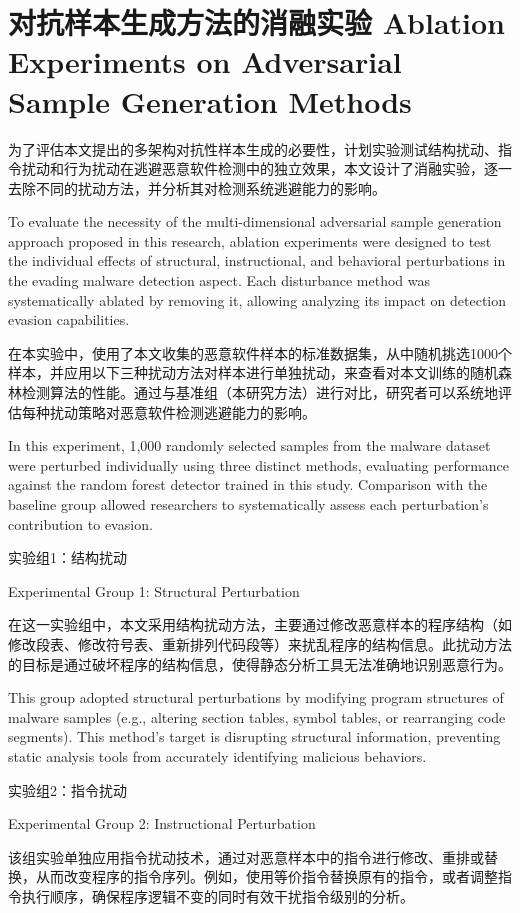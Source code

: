 \section{对抗样本生成方法的消融实验 Ablation Experiments on Adversarial Sample Generation Methods}

为了评估本文提出的多架构对抗性样本生成的必要性，计划实验测试结构扰动、指令扰动和行为扰动在逃避恶意软件检测中的独立效果，本文设计了消融实验，逐一去除不同的扰动方法，并分析其对检测系统逃避能力的影响。

To evaluate the necessity of the multi-dimensional adversarial sample generation approach proposed in this research, ablation experiments were designed to test the individual effects of structural, instructional, and behavioral perturbations in the evading malware detection aspect. Each disturbance method was systematically ablated by removing it, allowing analyzing its impact on detection evasion capabilities.

在本实验中，使用了本文收集的恶意软件样本的标准数据集，从中随机挑选1000个样本，并应用以下三种扰动方法对样本进行单独扰动，来查看对本文训练的随机森林检测算法的性能。通过与基准组（本研究方法）进行对比，研究者可以系统地评估每种扰动策略对恶意软件检测逃避能力的影响。

In this experiment, 1,000 randomly selected samples from the malware dataset were perturbed individually using three distinct methods, evaluating performance against the random forest detector trained in this study. Comparison with the baseline group allowed researchers to systematically assess each perturbation's contribution to evasion.

实验组1：结构扰动

Experimental Group 1: Structural Perturbation

在这一实验组中，本文采用结构扰动方法，主要通过修改恶意样本的程序结构（如修改段表、修改符号表、重新排列代码段等）来扰乱程序的结构信息。此扰动方法的目标是通过破坏程序的结构信息，使得静态分析工具无法准确地识别恶意行为。

This group adopted structural perturbations by modifying program structures of malware samples (e.g., altering section tables, symbol tables, or rearranging code segments). This method's target is disrupting structural information, preventing static analysis tools from accurately identifying malicious behaviors.

实验组2：指令扰动

Experimental Group 2: Instructional Perturbation

该组实验单独应用指令扰动技术，通过对恶意样本中的指令进行修改、重排或替换，从而改变程序的指令序列。例如，使用等价指令替换原有的指令，或者调整指令执行顺序，确保程序逻辑不变的同时有效干扰指令级别的分析。

